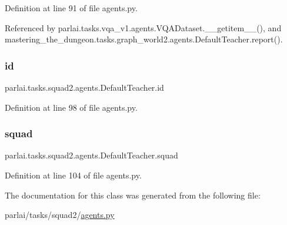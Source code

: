 Definition at line 91 of file agents.\+py.



Referenced by parlai.\+tasks.\+vqa\+\_\+v1.\+agents.\+V\+Q\+A\+Dataset.\+\_\+\+\_\+getitem\+\_\+\+\_\+(), and mastering\+\_\+the\+\_\+dungeon.\+tasks.\+graph\+\_\+world2.\+agents.\+Default\+Teacher.\+report().

\mbox{\label{classparlai_1_1tasks_1_1squad2_1_1agents_1_1DefaultTeacher_ac4998f160789f2d35c7ddc9c8b24792e}} 
\subsubsection{\texorpdfstring{id}{id}}
{\footnotesize\ttfamily parlai.\+tasks.\+squad2.\+agents.\+Default\+Teacher.\+id}



Definition at line 98 of file agents.\+py.

\mbox{\label{classparlai_1_1tasks_1_1squad2_1_1agents_1_1DefaultTeacher_a69f44b45bdcb0f11323c45781c4b20a2}} 
\subsubsection{\texorpdfstring{squad}{squad}}
{\footnotesize\ttfamily parlai.\+tasks.\+squad2.\+agents.\+Default\+Teacher.\+squad}



Definition at line 104 of file agents.\+py.



The documentation for this class was generated from the following file\+:\begin{DoxyCompactItemize}
\item 
parlai/tasks/squad2/\hyperlink{parlai_2tasks_2squad2_2agents_8py}{agents.\+py}\end{DoxyCompactItemize}
